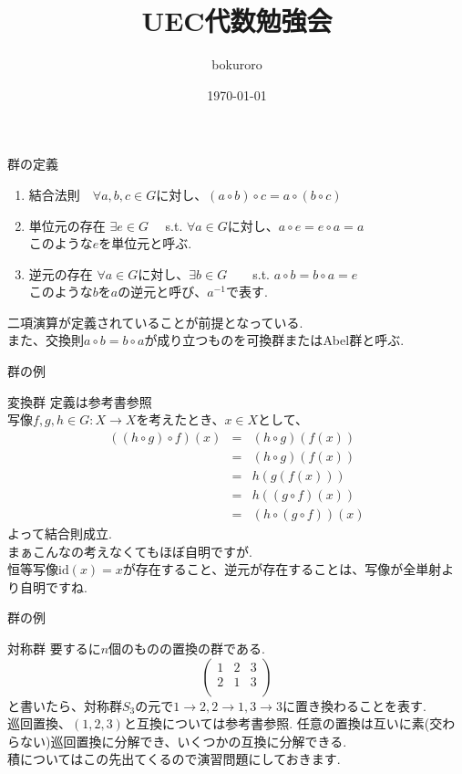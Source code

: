 \documentclass[dvipdfmx,11pt,notheorems]{beamer}
\title{UEC代数勉強会}
\author{bokuroro}
\date{\today}
\begin{document}
\maketitle
\begin{frame}{群の定義}
  \begin{enumerate}
   \item 結合法則　$\forall a,b,c \in G$に対し、$(a\circ b)\circ c=a\circ(b\circ c)$
   \item 単位元の存在 $\exists e \in G$　 s.t.  $\forall a \in G$に対し、$a\circ e=e\circ a=a$\\
   このような$e$を\alert{単位元}と呼ぶ.
   \item 逆元の存在 $\forall a \in G$に対し、$\exists b \in G$　　s.t.  $a\circ b = b\circ a=e$\\
   このような$b$を$a$の\alert{逆元}と呼び、$a^{-1}$で表す.
  \end{enumerate}
  \alert{二項演算}が定義されていることが前提となっている.\\
  また、交換則$a\circ b=b\circ a$が成り立つものを\alert{可換群}または\alert{Abel群}と呼ぶ.
\end{frame}
\begin{frame}{群の例}
  \begin{exampleblock}{変換群}
    定義は参考書参照\\
    写像$f,g,h \in G: X \rightarrow X$を考えたとき、$x \in X$として、
    \begin{eqnarray*}
      ((h\circ g)\circ f)(x) &=& (h\circ g)(f(x))\\
      &=&(h\circ g)(f(x))\\
      &=&h(g(f(x)))\\
      &=& h((g\circ f)(x))\\
      &=& (h\circ (g\circ f))(x)
    \end{eqnarray*}
    よって結合則成立. \\
    まぁこんなの考えなくてもほぼ自明ですが. \\
    恒等写像$\mathrm{id}(x)=x$が存在すること、逆元が存在することは、写像が全単射より自明ですね.
  \end{exampleblock}
\end{frame}
\begin{frame}{群の例}
  \begin{exampleblock}{対称群}
    要するに$n$個のものの置換の群である. \\
    \begin{equation*}
      \begin{pmatrix}
        1 & 2 & 3 \\
        2 & 1 & 3 \\
      \end{pmatrix}
    \end{equation*}
    と書いたら、対称群$S_3$の元で$1\rightarrow 2,2\rightarrow1,3\rightarrow3$に置き換わることを表す. \\
    \alert{巡回置換}、$(1,2,3)$と互換については参考書参照. 任意の置換は互いに素(交わらない)巡回置換に分解でき、いくつかの互換に分解できる. \\
    積についてはこの先出てくるので演習問題にしておきます.
  \end{exampleblock}
\end{frame}
\end{document}
